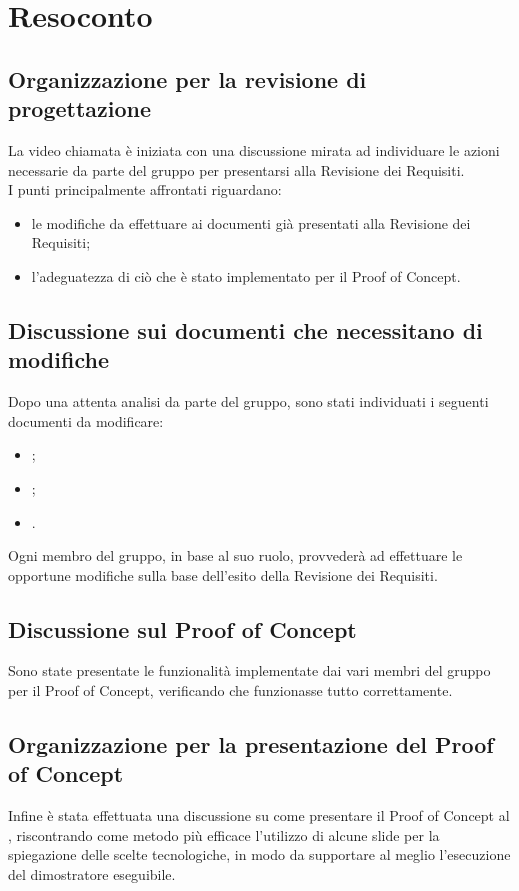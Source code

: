 \section{Resoconto}
\subsection{Organizzazione per la revisione di progettazione}
La video chiamata è iniziata con una discussione mirata ad individuare le azioni necessarie da parte del gruppo per presentarsi alla Revisione dei Requisiti. \\
I punti principalmente affrontati riguardano:
\begin{itemize}
\item le modifiche da effettuare ai documenti già presentati alla Revisione dei Requisiti;
\item l'adeguatezza di ciò che è stato implementato per il Proof of Concept.
\end{itemize}
\subsection{Discussione sui documenti che necessitano di modifiche}
Dopo una attenta analisi da parte del gruppo, sono stati individuati i seguenti documenti da modificare:
\begin{itemize}
\item {};
\item {};
\item {}.
\end{itemize}
Ogni membro del gruppo, in base al suo ruolo, provvederà ad effettuare le opportune modifiche sulla base dell'esito della Revisione dei Requisiti.
\subsection{Discussione sul Proof of Concept}
Sono state presentate le funzionalità implementate dai vari membri del gruppo per il Proof of Concept, verificando che funzionasse tutto correttamente.
\subsection{Organizzazione per la presentazione del Proof of Concept}
Infine è stata effettuata una discussione su come presentare il Proof of Concept al \CR , riscontrando come metodo più efficace l'utilizzo di alcune slide per la spiegazione delle scelte tecnologiche, in modo da supportare al meglio l'esecuzione del dimostratore eseguibile.